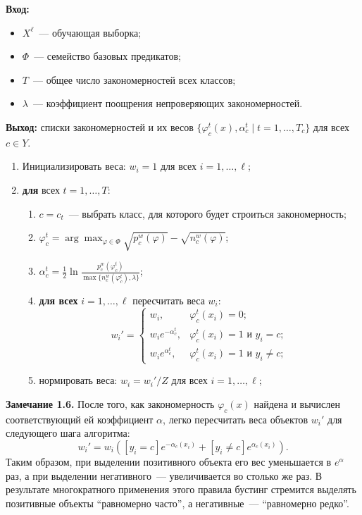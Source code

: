 \begin{itemize}
\textbf{Вход:}
\begin{itemize}
    \item $X^\ell$~--- обучающая выборка;
    \item $\Phi$~--- семейство базовых предикатов;
    \item $T$~--- общее число закономерностей всех классов;
    \item $\lambda$~--- коэффициент поощрения непроверяющих закономерностей.
\end{itemize}

\textbf{Выход:} списки закономерностей и их весов $\{ \varphi_c^t(x), \alpha_c^t \mid t = 1, \ldots, T_c \}$ для всех $c \in Y$.

\begin{enumerate}
    \item Инициализировать веса: $w_i = 1$ для всех $i = 1, \ldots, \ell$;
    \item \textbf{для} всех $t = 1, \ldots, T$:
    \begin{enumerate}
        \item $c = c_t$~--- выбрать класс, для которого будет строиться закономерность;
        \item $\varphi_c^t = \arg\max_{\varphi \in \Phi} \sqrt{p_c^w(\varphi)} - \sqrt{n_c^w(\varphi)}$;
        \item $\alpha_c^t = \frac{1}{2} \ln \frac{p_c^w(\varphi_c^t)}{\max\{n_c^w(\varphi_c^t), \lambda\}}$;
        \item \textbf{для всех} $i = 1, \ldots, \ell$ пересчитать веса $w_i$:
        \[
            w_i' =
            \begin{cases}
                w_i, & \varphi_c^t(x_i) = 0; \\
                w_i e^{-\alpha_c^t}, & \varphi_c^t(x_i) = 1 \text{ и } y_i = c; \\
                w_i e^{\alpha_c^t}, & \varphi_c^t(x_i) = 1 \text{ и } y_i \neq c;
            \end{cases}
        \]
        \item нормировать веса: $w_i = w_i' / Z$ для всех $i = 1, \ldots, \ell$;
    \end{enumerate}
\end{enumerate}

\textbf{Замечание 1.6.} После того, как закономерность $\varphi_c(x)$ найдена и вычислен соответствующий ей коэффициент $\alpha$, легко пересчитать веса объектов $w_i'$ для следующего шага алгоритма:
\[
    w_i' = w_i \left( \left[ y_i = c \right] e^{-\alpha_c(x_i)} + \left[ y_i \neq c \right] e^{\alpha_c(x_i)} \right).
\]
Таким образом, при выделении позитивного объекта его вес уменьшается в $e^\alpha$ раз, а при выделении негативного~--- увеличивается во столько же раз. В результате многократного применения этого правила бустинг стремится выделять позитивные объекты ``равномерно часто'', а негативные~--- ``равномерно редко''.


\end{itemize}
